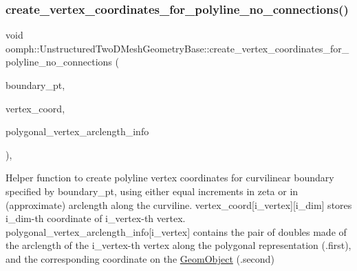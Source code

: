 \mbox{\label{classoomph_1_1UnstructuredTwoDMeshGeometryBase_aa4c390235c6d7865b62a6604a6d7b780}} 
\subsubsection{\texorpdfstring{create\+\_\+vertex\+\_\+coordinates\+\_\+for\+\_\+polyline\+\_\+no\+\_\+connections()}{create\_vertex\_coordinates\_for\_polyline\_no\_connections()}}
{\footnotesize\ttfamily void oomph\+::\+Unstructured\+Two\+D\+Mesh\+Geometry\+Base\+::create\+\_\+vertex\+\_\+coordinates\+\_\+for\+\_\+polyline\+\_\+no\+\_\+connections (\begin{DoxyParamCaption}\item[{\hyperlink{classoomph_1_1TriangleMeshCurviLine}{Triangle\+Mesh\+Curvi\+Line} $\ast$}]{boundary\+\_\+pt,  }\item[{\hyperlink{classoomph_1_1Vector}{Vector}$<$ \hyperlink{classoomph_1_1Vector}{Vector}$<$ double $>$ $>$ \&}]{vertex\+\_\+coord,  }\item[{\hyperlink{classoomph_1_1Vector}{Vector}$<$ std\+::pair$<$ double, double $>$ $>$ \&}]{polygonal\+\_\+vertex\+\_\+arclength\+\_\+info }\end{DoxyParamCaption})\hspace{0.3cm}{\ttfamily [inline]}, {\ttfamily [protected]}}



Helper function to create polyline vertex coordinates for curvilinear boundary specified by boundary\+\_\+pt, using either equal increments in zeta or in (approximate) arclength along the curviline. vertex\+\_\+coord\mbox{[}i\+\_\+vertex\mbox{]}\mbox{[}i\+\_\+dim\mbox{]} stores i\+\_\+dim-\/th coordinate of i\+\_\+vertex-\/th vertex. polygonal\+\_\+vertex\+\_\+arclength\+\_\+info\mbox{[}i\+\_\+vertex\mbox{]} contains the pair of doubles made of the arclength of the i\+\_\+vertex-\/th vertex along the polygonal representation (.first), and the corresponding coordinate on the \hyperlink{classoomph_1_1GeomObject}{Geom\+Object} (.second) 



